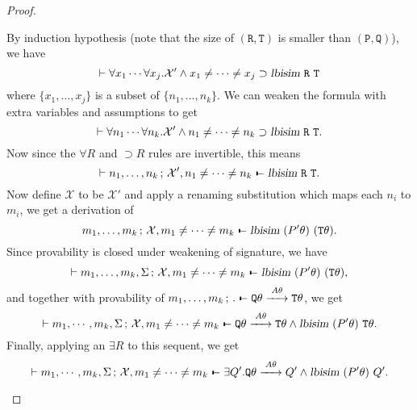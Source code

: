\documentclass{acmtrans2m}
\def\Xscr{{\mathcal X}}
\def\Ppi{{\mathtt P}}
\def\Qpi{{\mathtt Q}}
\def\Rpi{{\mathtt R}}
\def\Tpi{{\mathtt T}}
\def\relbar{\mathrel{\smash-}}
\def\joinrelm{\mathrel{\mkern-3.2mu}}
\def\tailpiece{\kern 1pt\vrule height 1ex width 0.3ex depth -.25ex}
\def\seqsym{\mathrel{\tailpiece\joinrelm\relbar}}
\newcommand{\NSeq}[3]{#1\,;\,#2 \seqsym #3}
\newcommand{\lbisim}[2]{\hbox{\sl lbisim}~#1~#2}
\newcommand{\oimp}{\supset}
\newcommand{\one  }[3]{#1\stackrel{#2}{-\!\!-\!\!\!\rightarrow    } #3}
\begin{document}
\begin{proof}
\begin{description}
$$$$
By induction hypothesis (note that the size of $(\Rpi,\Tpi)$ is smaller
than $(\Ppi,\Qpi)$), we have 
$$
\vdash \forall x_1 \cdots \forall x_j. \Xscr' \land x_1 \not = \cdots \not = x_j \oimp \lbisim \Rpi \Tpi
$$
where $\{x_1,\ldots,x_j\}$ is a subset of $\{n_1,\ldots, n_k\}.$
We can weaken the formula with extra variables and assumptions to get
$$
\vdash \forall n_1 \cdots \forall n_k. \Xscr' \land n_1 \not = \cdots \not = n_k \oimp \lbisim \Rpi \Tpi.
$$
Now since the $\forall R$ and $\oimp R$ rules are invertible, this means 
$$
\vdash \NSeq{n_1, \ldots, n_k}{\Xscr', n_1\not = \cdots \not = n_k}{\lbisim \Rpi \Tpi}.
$$
Now define $\Xscr$ to be $\Xscr'$ and apply a renaming
substitution which maps each $n_i$ to $m_i$, we get a derivation of
$$
\NSeq{m_1, \ldots, m_k}{\Xscr, m_1\not = \cdots \not = m_k}{\lbisim {(P'\theta)} {(\Tpi\theta)}}.
$$
Since provability is closed under weakening of signature, we have
$$
\vdash \NSeq{m_1, \ldots, m_k, \Sigma }{\Xscr, m_1\not = \cdots \not = m_k}{\lbisim {(P'\theta)} {(\Tpi\theta)}},
$$
and together with provability of 
$\NSeq{m_1,\ldots,m_k}{.}{\one{\Qpi\theta}{A\theta}{\Tpi\theta}}$, we get 
$$
\vdash \NSeq{m_1, \cdots, m_k, \Sigma}{\Xscr, m_1 \not = \cdots \not = m_k}{\one{\Qpi\theta}{A\theta}{\Tpi\theta}
\land \lbisim{(P'\theta)}{\Tpi\theta}}.
$$
Finally, applying an $\exists R$ to this sequent, we get
$$
\vdash \NSeq{m_1, \cdots, m_k, \Sigma}{\Xscr, m_1 \not = \cdots \not = m_k}{\exists Q'. \one{\Qpi\theta}{A\theta}{Q'}
\land \lbisim{(P'\theta)}{Q'}}. 
$$


\end{description}
\end{proof}
\end{document}
